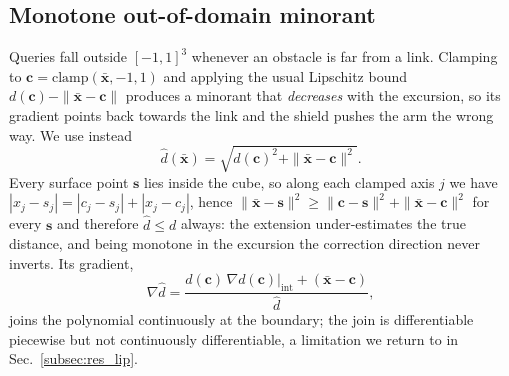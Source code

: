 \documentclass[journal]{IEEEtran}
\begin{document}
\subsection{Monotone out-of-domain minorant}\label{subsec:ood}
Queries fall outside $[-1,1]^3$ whenever an obstacle is far from a link. Clamping to $\mathbf{c}=\mathrm{clamp}(\bar{\mathbf{x}},-1,1)$ and applying the usual Lipschitz bound $d(\mathbf{c})-\|\bar{\mathbf{x}}-\mathbf{c}\|$ produces a minorant that \emph{decreases} with the excursion, so its gradient points back towards the link and the shield pushes the arm the wrong way. We use instead
\begin{equation}\label{eq:ood}
\hat d(\bar{\mathbf{x}})=\sqrt{d(\mathbf{c})^2+\|\bar{\mathbf{x}}-\mathbf{c}\|^2}.
\end{equation}
Every surface point $\mathbf{s}$ lies inside the cube, so along each clamped axis $j$ we have $|x_j-s_j|=|c_j-s_j|+|x_j-c_j|$, hence $\|\bar{\mathbf{x}}-\mathbf{s}\|^2\ge\|\mathbf{c}-\mathbf{s}\|^2+\|\bar{\mathbf{x}}-\mathbf{c}\|^2$ for every $\mathbf{s}$ and therefore $\hat d\le d$ always: the extension under-estimates the true distance, and being monotone in the excursion the correction direction never inverts. Its gradient,
\begin{equation}
\nabla\hat d=\frac{d(\mathbf{c})\,\nabla d(\mathbf{c})|_{\mathrm{int}}+(\bar{\mathbf{x}}-\mathbf{c})}{\hat d},
\end{equation}
joins the polynomial continuously at the boundary; the join is differentiable piecewise but not continuously differentiable, a limitation we return to in Sec.~\ref{subsec:res_lip}.
\end{document}
